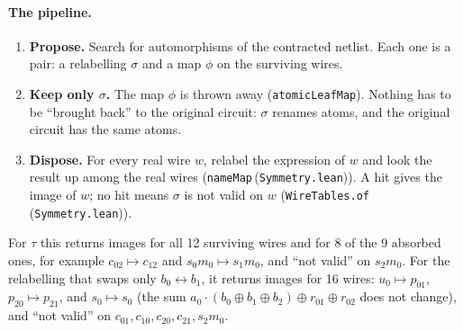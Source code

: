 \documentclass[11pt,a4paper]{article}
\theoremstyle{definition}
\theoremstyle{remark}
\newcommand{\code}[1]{\texttt{\small #1}}
\newcommand{\lean}[2]{\code{#1}\,(\code{#2})}
\begin{document}
\paragraph{The pipeline.}
\begin{center}
\end{center}
\begin{enumerate}[leftmargin=*]
\item \textbf{Propose.}  Search for automorphisms of the contracted netlist.  Each one is a pair:
  a relabelling $\sigma$ and a map $\phi$ on the surviving wires.
\item \textbf{Keep only $\sigma$.}  The map $\phi$ is thrown away (\code{atomicLeafMap}).  Nothing
  has to be ``brought back'' to the original circuit: $\sigma$ renames atoms, and the original
  circuit has the same atoms.
\item \textbf{Dispose.}  For every real wire $w$, relabel the expression of $w$ and look the
  result up among the real wires (\lean{nameMap}{Symmetry.lean}).  A hit gives the image of
  $w$; no hit means $\sigma$ is not valid on $w$ (\lean{WireTables.of}{Symmetry.lean}).
\end{enumerate}
For $\tau$ this returns images for all 12 surviving wires and for 8 of the 9 absorbed ones,
for example $c_{02}\mapsto c_{12}$ and $s_0m_0\mapsto s_1m_0$, and ``not valid'' on $s_2m_0$.
For the relabelling that swaps only $b_0\leftrightarrow b_1$, it returns images for 16 wires:
$u_0\mapsto p_{01}$, $p_{20}\mapsto p_{21}$, and $s_0\mapsto s_0$ (the sum
$a_0\cdot(b_0\oplus b_1\oplus b_2)\oplus r_{01}\oplus r_{02}$ does not change), and ``not valid''
on $c_{01},c_{10},c_{20},c_{21},s_2m_0$.
\end{document}
